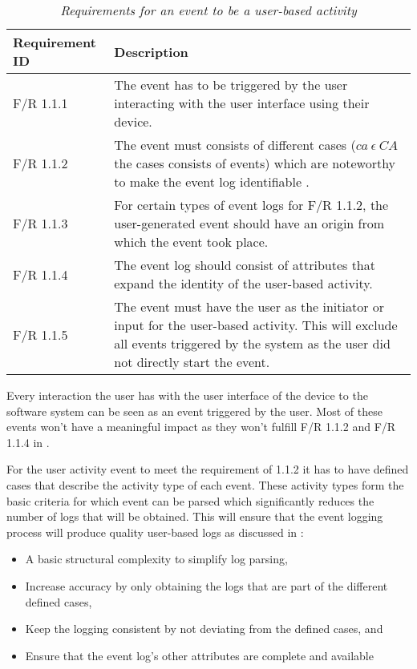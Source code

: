 \begin{table}[!htb]
	\centering
	\small
	\caption[Requirements for an event to be a user-based activity]
	{\textit{Requirements for an event to be a user-based activity}}
	\label{tbl:ch2_requirementsForUserActivtyEvent}
	\begin{tabularx}{\textwidth}{|l|X|}
		\hline \textbf{Requirement ID} & \textbf{Description}\\
		\hline F/R 1.1.1 & The event has to be triggered by the user interacting with the user interface using their device. \\
		\hline F/R 1.1.2 & The event must consists of different cases ($ca~ \epsilon~CA$ the cases consists of events) which are noteworthy to make the event log identifiable \cite{Slaninova2014}. \\
		\hline F/R 1.1.3 & For certain types of event logs for F/R 1.1.2, the user-generated event should have an origin from which the event took place. \\
		\hline F/R 1.1.4 & The event log should consist of attributes that expand the identity of the user-based activity. \\
		\hline F/R 1.1.5 & The event must have the user as the initiator or input for the user-based activity. This will exclude all events triggered by the system as the user did not directly start the event.\\ 
		\hline
	\end{tabularx}
\end{table}

Every interaction the user has with the user interface of the device to the software system can be seen as an event triggered by the user. Most of these events won't have a meaningful impact as they won't fulfill F/R 1.1.2 and F/R 1.1.4 in .\par For the user activity event to meet the requirement of 1.1.2 it has to have defined cases that describe the activity type of each event. These activity types form the basic criteria for which event can be parsed which significantly reduces the number of logs that will be obtained. This will ensure that the event logging process will produce quality user-based logs as discussed in :

\begin{itemize}
	\item A basic structural complexity to simplify log parsing,
	\item Increase accuracy by only obtaining the logs that are part of the different defined cases,
	\item Keep the logging consistent by not deviating from the defined cases, and
	\item Ensure that the event log's other attributes are complete and available
\end{itemize}

